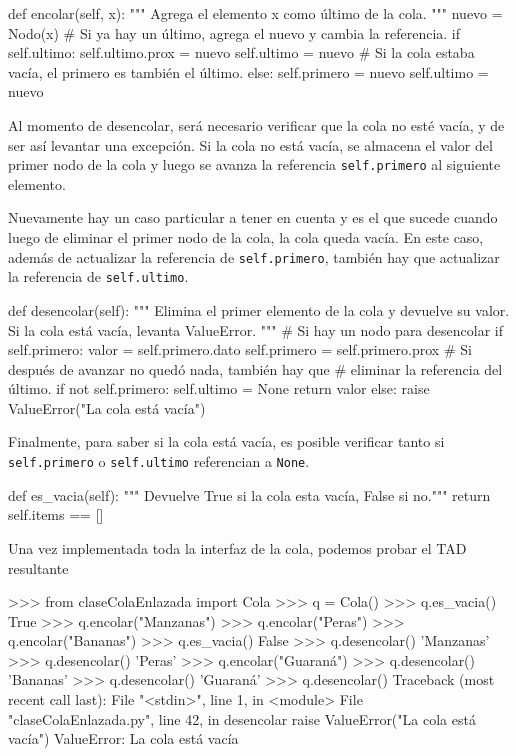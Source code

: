\begin{codigo-python-sn}
    def encolar(self, x):
        """ Agrega el elemento x como último de la cola. """
        nuevo = Nodo(x)
        # Si ya hay un último, agrega el nuevo y cambia la referencia.
        if self.ultimo:
            self.ultimo.prox = nuevo
            self.ultimo = nuevo
        # Si la cola estaba vacía, el primero es también el último.
        else:
            self.primero = nuevo
            self.ultimo = nuevo
\end{codigo-python-sn}

Al momento de desencolar, será necesario verificar que la cola no esté
vacía, y de ser así levantar una excepción.  Si la cola no está vacía,
se almacena el valor del primer nodo de la cola y luego se avanza la
referencia \lstinline!self.primero! al siguiente elemento.

Nuevamente hay un caso particular a tener en cuenta y es el que sucede
cuando luego de eliminar el primer nodo de la cola, la cola queda vacía.
En este caso, además de actualizar la referencia de
\lstinline!self.primero!, también hay que actualizar la referencia de
\lstinline!self.ultimo!.

\begin{codigo-python-sn}
    def desencolar(self):
        """ Elimina el primer elemento de la cola y devuelve su
            valor. Si la cola está vacía, levanta ValueError. """
        # Si hay un nodo para desencolar
        if self.primero:
            valor = self.primero.dato
            self.primero = self.primero.prox
            # Si después de avanzar no quedó nada, también hay que
            # eliminar la referencia del último.
            if not self.primero:
                self.ultimo = None
            return valor
        else:
            raise ValueError("La cola está vacía")
\end{codigo-python-sn}

Finalmente, para saber si la cola está vacía, es posible verificar tanto si
\lstinline!self.primero! o \lstinline!self.ultimo! referencian a
\lstinline!None!.

\begin{codigo-python-sn}
    def es_vacia(self):
        """ Devuelve True si la cola esta vacía, False si no."""
        return self.items == []
\end{codigo-python-sn}

Una vez implementada toda la interfaz de la cola, podemos probar el TAD
resultante

\begin{codigo-python-sn}
>>> from claseColaEnlazada import Cola
>>> q = Cola()
>>> q.es_vacia()
True
>>> q.encolar("Manzanas")
>>> q.encolar("Peras")
>>> q.encolar("Bananas")
>>> q.es_vacia()
False
>>> q.desencolar()
'Manzanas'
>>> q.desencolar()
'Peras'
>>> q.encolar("Guaraná")
>>> q.desencolar()
'Bananas'
>>> q.desencolar()
'Guaraná'
>>> q.desencolar()
Traceback (most recent call last):
  File "<stdin>", line 1, in <module>
  File "claseColaEnlazada.py", line 42, in desencolar
    raise ValueError("La cola está vacía")
ValueError: La cola está vacía
\end{codigo-python-sn}

